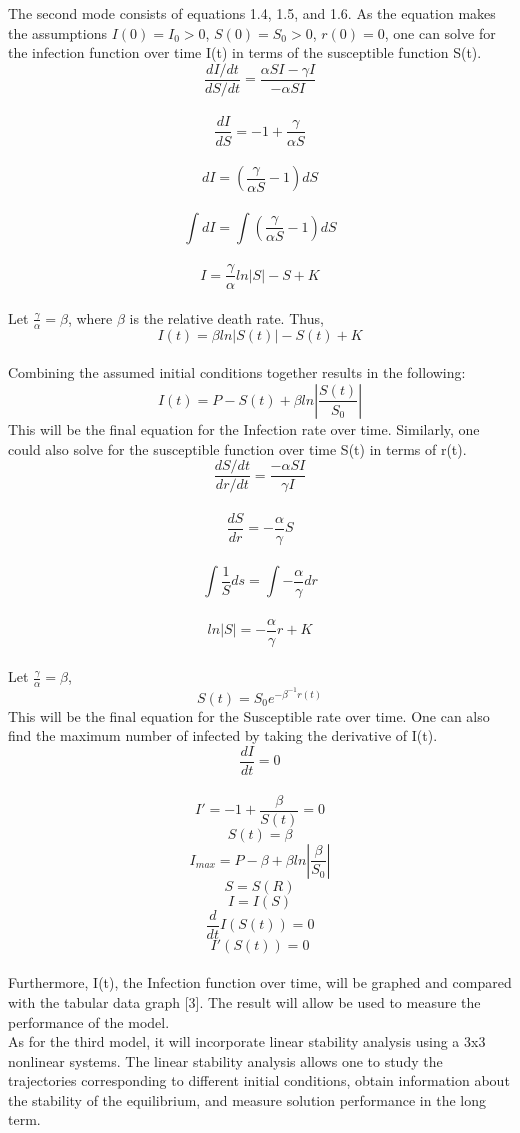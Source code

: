 \documentclass[a4paper, final, 12pt]{article}
\numberwithin{equation}{section}
\begin{document}
The second mode consists of equations 1.4, 1.5, and 1.6. As the equation makes the assumptions $I(0)=I_0 > 0$, $S(0)=S_0 > 0$, $r(0)=0$, one can solve for the infection function over time I(t) in terms of the susceptible function S(t). \\
$$\frac{dI/dt}{dS/dt} = \frac{\alpha SI-\gamma I}{-\alpha S I}$$\\
$$\frac{dI}{dS} = -1 + \frac{\gamma}{\alpha S}$$\\
$$dI = (\frac{\gamma}{\alpha S} - 1)dS$$\\
$$\int dI = \int (\frac{\gamma}{\alpha S} - 1)dS$$\\
$$I = \frac{\gamma }{\alpha}ln|S|-S+K$$\\
Let $\frac{\gamma}{\alpha} = \beta$, where \(\beta\) is the relative death rate. Thus,\\
$$I(t) = \beta ln|S(t)|-S(t)+K$$\\
Combining the assumed initial conditions together results in the following: \\
$$I(t) = P - S(t) + \beta ln|\frac{S(t)}{S_0}|$$
This will be the final equation for the Infection rate over time. 
Similarly, one could also solve for the susceptible function over time S(t) in terms of r(t). \\
$$\frac{dS/dt}{dr/dt} = \frac{-\alpha SI}{\gamma I}$$\\
$$\frac{dS}{dr} = -\frac{\alpha}{\gamma}S$$\\
$$\int \frac{1}{S}ds = \int -\frac{\alpha}{\gamma}dr$$\\
$$ln|S| = -\frac{\alpha}{\gamma}r+K$$\\
Let $\frac{\gamma}{\alpha} = \beta$, \\
$$S(t) = S_0e^{-\beta^{-1}r(t)}$$
This will be the final equation for the Susceptible rate over time. One can also find the maximum number of infected by taking the derivative of I(t). \\
$$\frac{dI}{dt} = 0$$\\
$$I' = -1 + \frac{\beta}{S(t)} = 0$$
$$S(t) = \beta $$
$$I_{max} = P - \beta + \beta ln|\frac{\beta}{S_0}|$$
$$S = S(R)$$
$$I = I(S)$$
$$\frac{d}{dt}I(S(t)) = 0$$
$$I'(S(t)) = 0$$\\

Furthermore, I(t), the Infection function over time, will be graphed and compared with the tabular data graph [3]. The result will allow be used to measure the performance of the model. \\

As for the third model, it will incorporate linear stability analysis using a 3x3 nonlinear systems. The linear stability analysis allows one to study the trajectories corresponding to different initial conditions, obtain information about the stability of the equilibrium, and measure solution performance in the long term. \\
\end{document}
